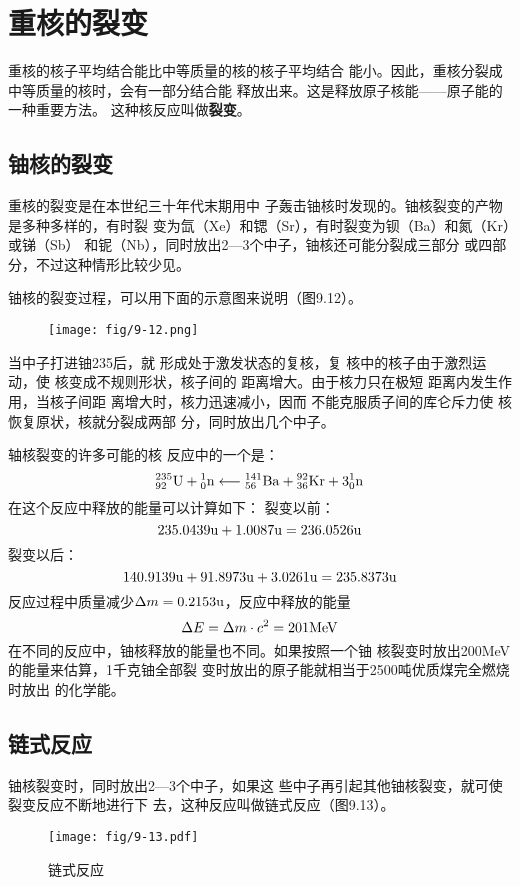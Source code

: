 \section{重核的裂变}
重核的核子平均结合能比中等质量的核的核子平均结合
能小。因此，重核分裂成中等质量的核时，会有一部分结合能
释放出来。这是释放原子核能——原子能的一种重要方法。
这种核反应叫做\textbf{裂变}。

\subsection{铀核的裂变}

重核的裂变是在本世纪三十年代末期用中
子轰击铀核时发现的。铀核裂变的产物是多种多样的，有时裂
变为氙（Xe）和锶（Sr），有时裂变为钡（Ba）和氮（Kr）或锑（Sb）
和铌（Nb），同时放出2—3个中子，铀核还可能分裂成三部分
或四部分，不过这种情形比较少见。

铀核的裂变过程，可以用下面的示意图来说明（图9.12）。
\begin{figure}[htp]\centering
\texttt{[image: fig/9-12.png]}
\caption{}
\end{figure}

当中子打进铀235后，就
形成处于激发状态的复核，复
核中的核子由于激烈运动，使
核变成不规则形状，核子间的
距离增大。由于核力只在极短
距离内发生作用，当核子间距
离增大时，核力迅速减小，因而
不能克服质子间的库仑斥力使
核恢复原状，核就分裂成两部
分，同时放出几个中子。

轴核裂变的许多可能的核
反应中的一个是：
\[\atom{U}{235}{92}+\atom{n}{1}{0}\longleftarrow \atom{Ba}{141}{56}+\atom{Kr}{92}{36}+3\atom{n}{1}{0}\]
在这个反应中释放的能量可以计算如下：
裂变以前：
\[235.0439{\rm u}+1.0087{\rm u}=236.0526{\rm u} \]
裂变以后：
\[140.9139{\rm u}+91.8973{\rm u}+3.0261{\rm u}=235.8373{\rm u} \]
反应过程中质量减少$\Delta m=0.2153{\rm u}$，反应中释放的能量
\[\Delta E=\Delta m\cdot c^2=201{\rm MeV}\]
在不同的反应中，铀核释放的能量也不同。如果按照一个铀
核裂变时放出200MeV的能量来估算，1千克铀全部裂
变时放出的原子能就相当于2500吨优质煤完全燃烧时放出
的化学能。

\subsection{链式反应} 

铀核裂变时，同时放出2—3个中子，如果这
些中子再引起其他铀核裂变，就可使裂变反应不断地进行下
去，这种反应叫做链式反应（图9.13）。

\begin{figure}[htp]
    \centering
    \texttt{[image: fig/9-13.pdf]}
    \caption{链式反应}
\end{figure}


